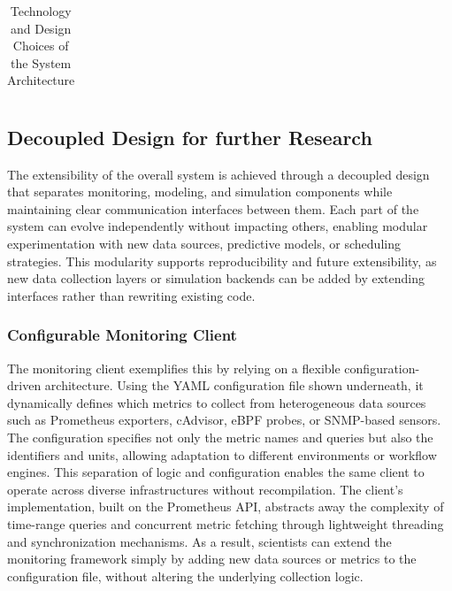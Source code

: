\begin{table}[H]
{\begin{tabular}{
            p{4.5cm}
            >{\centering\arraybackslash}p{2.8cm}
            p{8.2cm}
            }
            \bottomrule
        \end{tabular}
    }
    \small
    \caption{Technology and Design Choices of the System Architecture}
    \label{tab:technology}
\end{table}


\subsection{Decoupled Design for further Research}
\label{sec:extensibility_through_decoupled_design}
The extensibility of the overall system is achieved through a decoupled design that separates monitoring, modeling, and simulation components while maintaining clear communication interfaces between them. Each part of the system can evolve independently without impacting others, enabling modular experimentation with new data sources, predictive models, or scheduling strategies. This modularity supports reproducibility and future extensibility, as new data collection layers or simulation backends can be added by extending interfaces rather than rewriting existing code.

\subsubsection{Configurable Monitoring Client}
\label{sec:monitoring_client}
The monitoring client exemplifies this by relying on a flexible configuration-driven architecture. Using the YAML configuration file shown underneath, it dynamically defines which metrics to collect from heterogeneous data sources such as Prometheus exporters, cAdvisor, eBPF probes, or SNMP-based sensors. The configuration specifies not only the metric names and queries but also the identifiers and units, allowing adaptation to different environments or workflow engines. This separation of logic and configuration enables the same client to operate across diverse infrastructures without recompilation. The client's implementation, built on the Prometheus API, abstracts away the complexity of time-range queries and concurrent metric fetching through lightweight threading and synchronization mechanisms. As a result, scientists can extend the monitoring framework simply by adding new data sources or metrics to the configuration file, without altering the underlying collection logic.

% 

